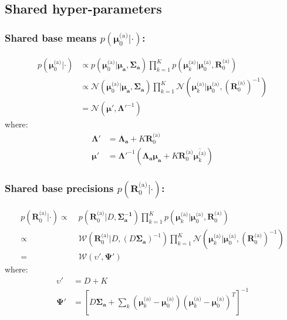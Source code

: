 \documentclass[smallextended]{svjour3}          %
\newcommand{\Muo}{\boldsymbol{\mu}_{0}^\text{(a)}}
\newcommand{\Ro}{\mathbf{R}_{0}^\text{(a)}}
\newcommand{\invRo}{\left(\mathbf{R}_{0}^\text{(a)}\right)^{-1}}
\newcommand{\Muk}{\boldsymbol{\mu}_{k}^\text{(a)}}
\begin{document}
\subsection{Shared hyper-parameters}
\subsubsection*{Shared base means $p(\Muo | \cdot)$:}
\begin{align*}
p(\Muo | \cdot) 
&\propto
p\left(\Muo | \boldsymbol{\mu_a}, \boldsymbol{\Sigma_a}\right)
\prod_{k = 1}^K p\left(\Muk | \Muo, \Ro \right)  \\
&\propto
\mathcal{N}\left(\Muo | \boldsymbol{\mu_a, \Sigma_a}\right)
\prod_{k = 1}^K\mathcal{N}\left(\Muk | \Muo, \invRo\right)  \\
&=\mathcal{N}\left(\boldsymbol{\mu'}, \boldsymbol{\Lambda'}^{-1}\right)
\end{align*}
where:
\begin{align*}
\boldsymbol{\Lambda'} &= \boldsymbol{\Lambda_{a}} + K \Ro\\ 
\boldsymbol{\mu'} &= \boldsymbol{\Lambda'}^{-1} \left(\boldsymbol{\Lambda_{a}} \boldsymbol{\mu_{a}} + K \Ro \overline{\Muk}\right)
\end{align*}


\subsubsection*{Shared base precisions $p(\Ro | \cdot)$:}
\begin{align*}
p(\Ro | \cdot) 
\propto\;&
p\left(\Ro | D, \boldsymbol{\Sigma_a^{-1}}\right) 
\prod_{k = 1}^K p\left(\Muk | \Muo, \Ro\right) \\
\propto\;&
\mathcal{W}\left(\Ro | D, (D\boldsymbol{\Sigma_a})^{-1}\right)
\prod_{k = 1}^K \mathcal{N}\left(\Muk | \Muo,  \invRo \right) \\
=\;&
\mathcal{W}(\upsilon', \boldsymbol{\Psi}')
\end{align*}
where:
\begin{align*}
\upsilon' &= D+K\\
\boldsymbol{\Psi'} &=
\left[D\boldsymbol{\Sigma_a} + \sum_k (\Muk- \Muo)(\Muk- \Muo)^T \right]^{-1}
\end{align*}
\end{document}
